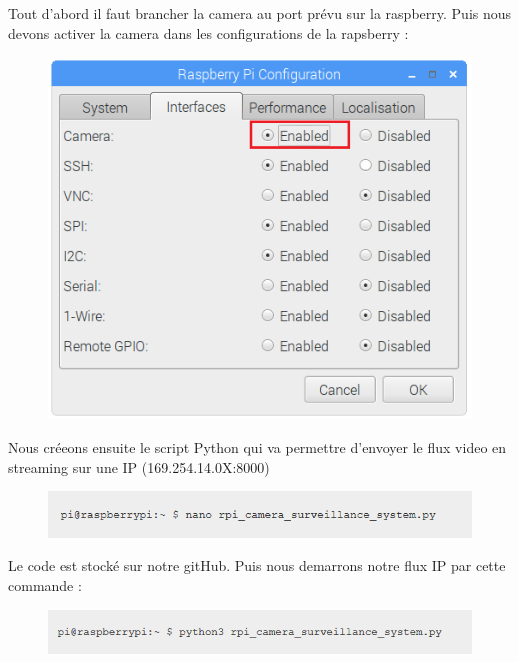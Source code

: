 \documentclass[a4paper,11pt]{report}
\begin{document}
			Tout d'abord il faut brancher la camera au port prévu sur la raspberry. \newline
			Puis nous devons activer la camera dans les configurations de la rapsberry :
			\begin{figure}[!h]
				\begin{center}
					\includegraphics[scale=0.7]{Illustrations/11.png}
				\end{center}
			\end{figure}
		  \newline Nous créeons ensuite le script Python qui va permettre d'envoyer le flux video en streaming sur une IP (169.254.14.0X:8000)
			\begin{figure}[!h]
				\begin{center}
					\includegraphics[scale=0.7]{Illustrations/12.png}
				\end{center}
			\end{figure}
			\newline Le code est stocké sur notre gitHub.\newpage
			Puis nous demarrons notre flux IP par cette commande :
			\begin{figure}[!h]
				\begin{center}
					\includegraphics[scale=0.7]{Illustrations/13.png}
				\end{center}
			\end{figure}
			
\end{document}
